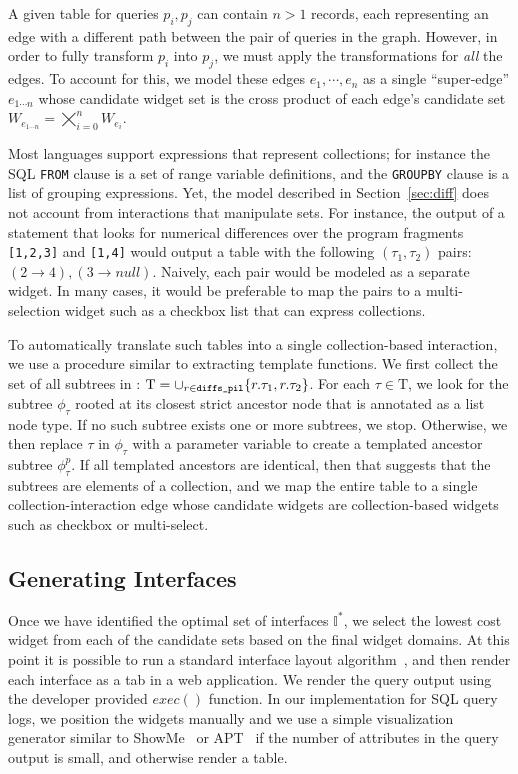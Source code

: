 A given \diffspil table for queries $p_i, p_j$ can contain $n>1$ records, each representing an edge with a different path between the pair of queries in the graph.  However, in order to fully transform $p_i$ into $p_j$, we must apply the transformations for {\it all} the edges.   To account for this, we model these edges $e_1,\cdots,e_n$ as a single ``super-edge'' $e_{1\cdots n}$  whose candidate widget set is the cross product of each edge's candidate set $W_{e_{1\cdots n}} = \varprod_{i=0}^n W_{e_i}$.

Most languages support expressions that represent collections; for instance the SQL \texttt{FROM} clause is a set of range variable definitions, and the \texttt{GROUPBY} clause is a list of grouping expressions. Yet, the model described in Section~\ref{sec:diff} does not account from interactions that manipulate sets.  For instance, the output of a \lang statement that looks for numerical differences over the program fragments \texttt{[1,2,3]} and \texttt{[1,4]} would output a table with the following $(\tau_1, \tau_2)$ pairs: $(2\rightarrow4), (3\rightarrow null)$.  Naively, each pair would be modeled as a separate widget. In many cases, it would be preferable to map the pairs to a multi-selection widget such as a checkbox list that can express collections.

To automatically translate such \diffspil tables into a single collection-based interaction, we use a procedure similar to extracting template functions.  We first collect the set of all subtrees in \diffspil: $\mathrm{T} = \cup_{r \in \texttt{diffs\_pil}} \{ r.\tau_1, r.\tau_2 \} $.  For each $\tau \in \mathrm{T}$, we look for the subtree $\phi_\tau$ rooted at its closest strict ancestor node that is annotated as a list node type. If no such subtree exists one or more subtrees, we stop.  Otherwise, we then replace $\tau$ in $\phi_\tau$ with a parameter variable to create a templated ancestor subtree $\phi^p_\tau$.  If all templated ancestors are identical, then that suggests that the subtrees are elements of a collection, and we map the entire \diffspil table to a single collection-interaction edge whose candidate widgets are collection-based widgets such as checkbox or multi-select.


\subsection{Generating Interfaces}
Once we have identified the optimal set of interfaces $\mathbb{I}^*$, we select the lowest cost widget from each of the candidate sets based on the final widget domains.  At this point it is possible to run a standard interface layout algorithm~\cite{sears1993layout}, and then render each interface as a tab in a web application.  We render the query output using the developer provided $exec()$ function.  In our implementation for SQL query logs, we position the widgets manually and we use a simple visualization generator similar to ShowMe~\cite{mackinlay2007show} or APT~\cite{mackinlay1986automating} if the number of attributes in the query output is small, and otherwise render a table.


